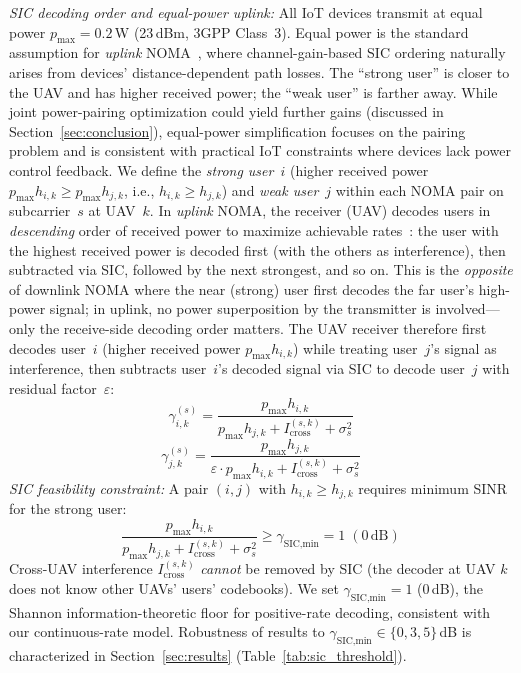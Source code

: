 \documentclass[journal]{IEEEtran}
\begin{document}
\emph{SIC decoding order and equal-power uplink:}
All IoT devices transmit at equal power $p_{\max} = 0.2$\,W (23\,dBm, 3GPP Class~3).
Equal power is the standard assumption for \emph{uplink} NOMA~\cite{saito2013non,di2017sub}, where channel-gain-based SIC ordering naturally arises from devices' distance-dependent path losses.
The ``strong user'' is closer to the UAV and has higher received power; the ``weak user'' is farther away.
While joint power-pairing optimization could yield further gains (discussed in Section~\ref{sec:conclusion}), equal-power simplification focuses on the pairing problem and is consistent with practical IoT constraints where devices lack power control feedback.
We define the \emph{strong user}~$i$ (higher received power $p_{\max} h_{i,k} \geq p_{\max} h_{j,k}$, i.e., $h_{i,k} \geq h_{j,k}$) and \emph{weak user}~$j$ within each NOMA pair on subcarrier~$s$ at UAV~$k$.
In \emph{uplink} NOMA, the receiver (UAV) decodes users in \emph{descending} order of received power to maximize achievable rates~\cite{ding2017survey,saito2013non}: the user with the highest received power is decoded first (with the others as interference), then subtracted via SIC, followed by the next strongest, and so on.
This is the \emph{opposite} of downlink NOMA where the near (strong) user first decodes the far user's high-power signal; in uplink, no power superposition by the transmitter is involved---only the receive-side decoding order matters.
The UAV receiver therefore first decodes user~$i$ (higher received power $p_{\max}h_{i,k}$) while treating user~$j$'s signal as interference, then subtracts user~$i$'s decoded signal via SIC to decode user~$j$ with residual factor~$\varepsilon$:
\begin{equation}
    \gamma_{i,k}^{(s)} = \frac{p_{\max} h_{i,k}}{p_{\max} h_{j,k} + I_{\text{cross}}^{(s,k)} + \sigma_s^2}
    \label{eq:sinr_strong}
\end{equation}
\begin{equation}
    \gamma_{j,k}^{(s)} = \frac{p_{\max} h_{j,k}}{\varepsilon \cdot p_{\max} h_{i,k} + I_{\text{cross}}^{(s,k)} + \sigma_s^2}
    \label{eq:sinr_weak}
\end{equation}
\emph{SIC feasibility constraint:}
A pair $(i, j)$ with $h_{i,k} \geq h_{j,k}$ requires minimum SINR for the strong user:
\begin{equation}
    \frac{p_{\max} h_{i,k}}{p_{\max} h_{j,k} + I_{\text{cross}}^{(s,k)} + \sigma_s^2} \geq \gamma_{\text{SIC,min}} = 1\;(0\,\text{dB})
    \label{eq:sic_feasibility}
\end{equation}
Cross-UAV interference $I_{\text{cross}}^{(s,k)}$ \emph{cannot} be removed by SIC (the decoder at UAV $k$ does not know other UAVs' users' codebooks).
We set $\gamma_{\text{SIC,min}} = 1$ (0\,dB), the Shannon information-theoretic floor for positive-rate decoding, consistent with our continuous-rate model.
Robustness of results to $\gamma_{\text{SIC,min}} \in \{0, 3, 5\}$\,dB is characterized in Section~\ref{sec:results} (Table~\ref{tab:sic_threshold}).
\end{document}
